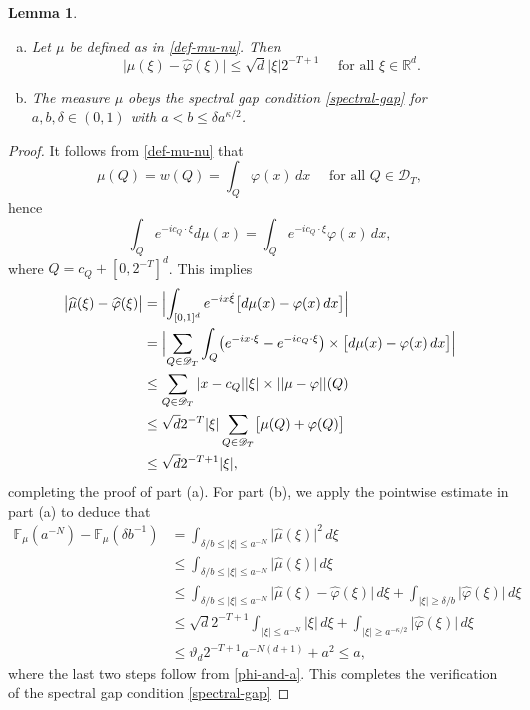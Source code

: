 \documentclass[a4paper,11pt]{amsart}
\newtheorem{lem}[thm]{\bf Lemma}
\numberwithin{equation}{section}
\begin{document}
\begin{lem} \label{spectral-gap-lemma}
\begin{enumerate}[(a)]
\item Let $\mu$ be defined as in \eqref{def-mu-nu}. Then
\[ \bigl| \widehat{\mu}(\xi) - \widehat{\varphi}(\xi) \bigr| \leq \sqrt{d} |\xi|2^{-T+1} \quad \text{ for all } \xi \in \mathbb R^d.   \]  
\item The measure $\mu$ obeys the spectral gap condition \eqref{spectral-gap} for $a, b, \delta \in (0,1)$ with $a < b \leq \delta a^{\kappa/2}$. 
\end{enumerate} 
\end{lem} 
\begin{proof} 
It follows from \eqref{def-mu-nu} that 
\[ \mu(Q) = w(Q) = \int_Q \varphi(x) \, dx \quad \text{ for all } Q \in \mathscr{D}_T, \]
hence 
 \[ \int_{Q} e^{-i c_{Q}\cdot \xi} d\mu(x) = \int_{Q} e^{-i c_{Q} \cdot \xi} \varphi(x) \, dx, \] 
 where $Q = c_Q + [0, 2^{-T}]^d$.  This implies 
 \begin{align*}
 \bigl| \widehat{\mu}(\xi) - \widehat{\varphi}(\xi) \bigr| &= \Bigl| \int_{[0,1]^d} e^{-ix\dot \xi} \bigl[ d\mu(x) - \varphi(x) \, dx \bigr] \Bigr| \\  
 &= \Bigl| \sum_{Q \in \mathscr{D}_T} \int_{Q} \bigl( e^{-ix\cdot \xi} - e^{-i c_{Q} \cdot \xi} \bigr) \times \bigl[ d\mu(x) - \varphi(x) \, dx \bigr] \Bigr| \\ 
 &\leq \sum_{Q \in \mathscr{D}_T} |x - c_{Q}||\xi| \times  ||\mu - \varphi||(Q) \\
 &\leq \sqrt{d} 2^{-T} |\xi| \sum_{Q \in \mathscr{D}_T} \bigl[ \mu(Q) + \varphi(Q) \bigr] \\ 
 & \leq \sqrt{d} 2^{-T+1} |\xi|, 
 \end{align*} 
 completing the proof of part (a). 
 \vskip0.1in
 \noindent For part (b), we apply the pointwise estimate in part (a) to deduce that 
 \begin{align*}
 \mathbb F_{\mu}(a^{-N}) - \mathbb F_{\mu}(\delta b^{-1}) &= \int_{\delta/b \leq |\xi| \leq a^{-N}} \bigl| \widehat{\mu}(\xi) \bigr|^2 \, d\xi \\ 
 &\leq \int_{\delta/b \leq |\xi| \leq a^{-N}} \bigl| \widehat{\mu}(\xi) \bigr| \, d\xi \\ 
 &\leq \int_{\delta/b \leq |\xi| \leq a^{-N}} \bigl| \widehat{\mu}(\xi) - \widehat{\varphi}(\xi) \bigr| \, d\xi + \int_{|\xi| \geq \delta/b}  \bigl| \widehat{\varphi}(\xi) \bigr| \, d\xi \\ 
 &\leq  \sqrt{d} 2^{-T+1} \int_{|\xi| \leq a^{-N}} |\xi| \, d\xi +  \int_{|\xi| \geq a^{-\kappa/2}}  \bigl| \widehat{\varphi}(\xi) \bigr| \, d\xi \\ 
 &\leq \vartheta_d 2^{-T+1} a^{-N(d+1)} + a^2 \leq a, 
 \end{align*}  
 where the last two steps follow from \eqref{phi-and-a}. This completes the verification of the spectral gap condition \eqref{spectral-gap} 
\end{proof} 
\end{document}
